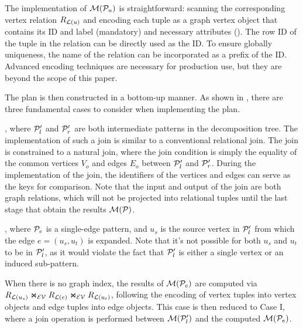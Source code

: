  The implementation of $\mathcal{M}(\mathcal{P}_u)$ is straightforward: scanning the corresponding vertex relation ${R_{\mathcal{L}(u)}}$ and encoding each tuple as a graph vertex object that contains its ID and label (mandatory) and necessary attributes (). The row ID of the tuple in the relation can be directly used as the ID. To ensure globally uniqueness, the name of the relation can be incorporated as a prefix of the ID. Advanced encoding techniques are necessary for production use, but they are beyond the scope of this paper.

The plan is then constructed in a bottom-up manner. As shown in , there are three fundamental cases to consider when implementing the plan.

, where $\mathcal{P}_l'$ and $\mathcal{P}'_r$ are both intermediate patterns in the decomposition tree. The implementation of such a join is similar to a conventional relational join. The join is constrained to a natural join, where the join condition is simply the equality of the common vertices $V_o$ and edges $E_o$ between $\mathcal{P}_l'$ and $\mathcal{P}_r'$. During the implementation of the join, the identifiers of the vertices and edges can serve as the keys for comparison. Note that the input and output of the join are both graph relations, which will not
be projected into relational tuples until the last stage that obtain the results $\mathcal{M}(\mathcal{P})$.

, where $\mathcal{P}_e$ is a single-edge pattern, and $u_s$ is the source vertex in $\mathcal{P}'_l$ from which the edge $e = (u_s, u_t)$ is expanded. Note that it's not possible for both $u_s$ and $u_t$ to be in $\mathcal{P}'_l$, as it would violate the fact that $\mathcal{P}'_l$ is either a single vertex or an induced sub-pattern.

When there is no graph index, the results of $\mathcal{M}(\mathcal{P}_e)$ are computed via $R_{\mathcal{L}(u_s)} \Join_\mathcal{EV} R_{\mathcal{L}(e)} \Join_\mathcal{EV} R_{\mathcal{L}(u_t)}$, following the encoding of vertex tuples into vertex objects and edge tuples into edge objects.
This case is then reduced to Case I, where a join operation is performed between $\mathcal{M}(\mathcal{P}'_l)$ and the computed $\mathcal{M}(\mathcal{P}_e)$.

